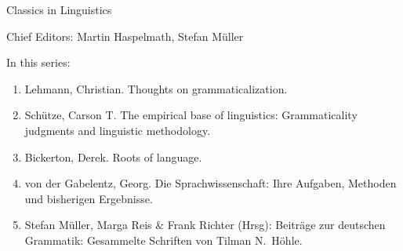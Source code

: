 {\large Classics in Linguistics}

\bigskip

Chief Editors: Martin Haspelmath, Stefan Müller

\bigskip

In this series:

\begin{enumerate}
\item Lehmann, Christian. Thoughts on grammaticalization.
\item Schütze, Carson T. The empirical base of linguistics: Grammaticality judgments and linguistic methodology.
\item Bickerton, Derek. Roots of language.
\item von der Gabelentz, Georg. Die Sprachwissenschaft:  Ihre Aufgaben, Methoden und bisherigen
  Ergebnisse.
\item Stefan Müller, Marga Reis \& Frank Richter (Hrsg): Beiträge zur deutschen Grammatik: Gesammelte Schriften von Tilman N.\ Höhle.
\end{enumerate}


\vfill

